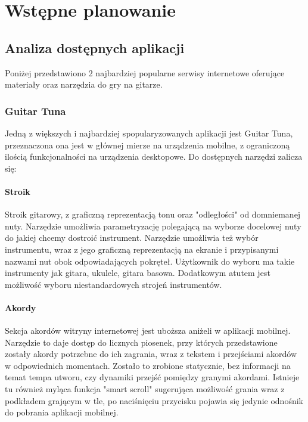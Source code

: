 \chapter{Wstępne planowanie}

\section{Analiza dostępnych aplikacji}

Poniżej przedstawiono 2 najbardziej popularne serwisy internetowe oferujące materiały oraz narzędzia do gry na gitarze. 

\subsection{Guitar Tuna}

Jedną z większych i najbardziej spopularyzowanych aplikacji jest Guitar Tuna, przeznaczona ona jest w głównej mierze na urządzenia mobilne, z ograniczoną ilością funkcjonalności na urządzenia desktopowe. Do dostępnych narzędzi zalicza się:

\subsubsection{Stroik}

Stroik gitarowy, z graficzną reprezentacją tonu oraz "odległości" od domniemanej nuty. Narzędzie umożliwia parametryzację polegającą na wyborze docelowej nuty do jakiej chcemy dostroić instrument. Narzędzie umożliwia też wybór instrumentu, wraz z jego graficzną reprezentacją na ekranie i przypisanymi nazwami nut obok odpowiadających pokręteł. Użytkownik do wyboru ma takie instrumenty jak gitara, ukulele, gitara basowa. Dodatkowym atutem jest możliwość wyboru niestandardowych strojeń instrumentów. 


\subsubsection{Akordy}

Sekcja akordów witryny internetowej jest uboższa aniżeli w aplikacji mobilnej. Narzędzie to daje dostęp do licznych piosenek, przy których przedstawione zostały akordy potrzebne do ich zagrania, wraz z tekstem i przejściami akordów w odpowiednich momentach. Zostało to zrobione statycznie, bez informacji na temat tempa utworu, czy dynamiki przejść pomiędzy granymi akordami. Istnieje tu również myląca funkcja "smart scroll" sugerująca możliwość grania wraz z podkładem grającym w tle, po naciśnięciu przycisku pojawia się jedynie odnośnik do pobrania aplikacji mobilnej.

